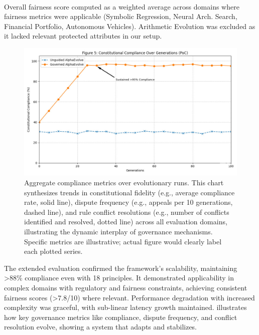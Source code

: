 \documentclass[manuscript,screen,review,anonymous,9pt]{acmart}
\begin{document}
\begin{table}[htbp]
\begin{minipage}{\linewidth}\footnotesize \textsuperscript{\dag}Overall fairness score computed as a weighted average across domains where fairness metrics were applicable (Symbolic Regression, Neural Arch. Search, Financial Portfolio, Autonomous Vehicles). Arithmetic Evolution was excluded as it lacked relevant protected attributes in our setup.\end{minipage}
\end{table}

\begin{figure}[htbp]
\centering
\includegraphics[width=\linewidth,keepaspectratio]{Figure_5_compliance_generations.png} %
\caption{Aggregate compliance metrics over evolutionary runs. This chart synthesizes trends in constitutional fidelity (e.g., average compliance rate, solid line), dispute frequency (e.g., appeals per 10 generations, dashed line), and rule conflict resolutions (e.g., number of conflicts identified and resolved, dotted line) across all evaluation domains, illustrating the dynamic interplay of governance mechanisms. Specific metrics are illustrative; actual figure would clearly label each plotted series.}
\label{fig:compliance-trends}
\end{figure}
The extended evaluation confirmed the framework's scalability, maintaining >88\% compliance even with 18 principles. It demonstrated applicability in complex domains with regulatory and fairness constraints, achieving consistent fairness scores (>7.8/10) where relevant. Performance degradation with increased complexity was graceful, with sub-linear latency growth maintained.  illustrates how key governance metrics like compliance, dispute frequency, and conflict resolution evolve, showing a system that adapts and stabilizes.
\end{document}
